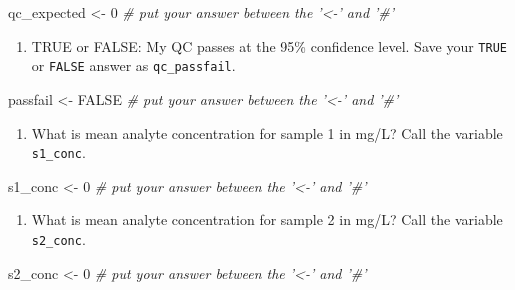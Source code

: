 \documentclass[]{tufte-book}
\newenvironment{Shaded}{}{}
\newcommand{\CommentTok}[1]{\textcolor[rgb]{0.38,0.63,0.69}{\textit{#1}}}
\newcommand{\DecValTok}[1]{\textcolor[rgb]{0.25,0.63,0.44}{#1}}
\newcommand{\NormalTok}[1]{#1}
\newcommand{\OtherTok}[1]{\textcolor[rgb]{0.00,0.44,0.13}{#1}}
\newcommand{\StringTok}[1]{\textcolor[rgb]{0.25,0.44,0.63}{#1}}
\providecommand{\tightlist}{%
  \setlength{\itemsep}{0pt}\setlength{\parskip}{0pt}}
\begin{document}
\begin{Shaded}
\begin{Highlighting}[]
\NormalTok{qc_expected <-}\StringTok{ }\DecValTok{0}     \CommentTok{# put your answer between the '<-' and '#'}
\end{Highlighting}
\end{Shaded}

\begin{enumerate}
\def\labelenumi{\arabic{enumi}.}
\setcounter{enumi}{4}
\tightlist
\item
  TRUE or FALSE: My QC passes at the 95\% confidence level. Save your \texttt{TRUE} or \texttt{FALSE} answer as \texttt{qc\_passfail}.
\end{enumerate}

\begin{Shaded}
\begin{Highlighting}[]
\NormalTok{passfail <-}\StringTok{ }\OtherTok{FALSE}     \CommentTok{# put your answer between the '<-' and '#'}
\end{Highlighting}
\end{Shaded}

\begin{enumerate}
\def\labelenumi{\arabic{enumi}.}
\setcounter{enumi}{5}
\tightlist
\item
  What is mean analyte concentration for sample 1 in mg/L? Call the variable \texttt{s1\_conc}.
\end{enumerate}

\begin{Shaded}
\begin{Highlighting}[]
\NormalTok{s1_conc <-}\StringTok{ }\DecValTok{0}     \CommentTok{# put your answer between the '<-' and '#'}
\end{Highlighting}
\end{Shaded}

\begin{enumerate}
\def\labelenumi{\arabic{enumi}.}
\setcounter{enumi}{6}
\tightlist
\item
  What is mean analyte concentration for sample 2 in mg/L? Call the variable \texttt{s2\_conc}.
\end{enumerate}

\begin{Shaded}
\begin{Highlighting}[]
\NormalTok{s2_conc <-}\StringTok{ }\DecValTok{0}     \CommentTok{# put your answer between the '<-' and '#'}
\end{Highlighting}
\end{Shaded}
\end{document}
